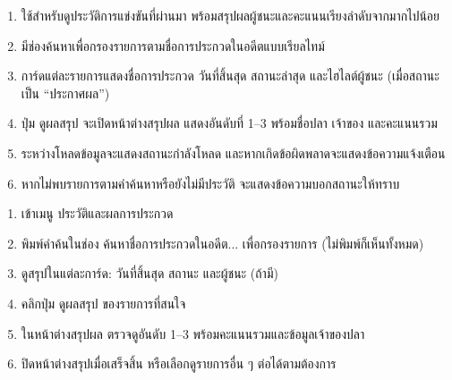 \par

\begin{sloppypar}
	\begin{enumerate}
		\item ใช้สำหรับดูประวัติการแข่งขันที่ผ่านมา พร้อมสรุปผลผู้ชนะและคะแนนเรียงลำดับจากมากไปน้อย
		\item มีช่องค้นหาเพื่อกรองรายการตามชื่อการประกวดในอดีตแบบเรียลไทม์
		\item การ์ดแต่ละรายการแสดงชื่อการประกวด วันที่สิ้นสุด สถานะล่าสุด และไฮไลต์ผู้ชนะ (เมื่อสถานะเป็น “ประกาศผล”)
		\item ปุ่ม ดูผลสรุป จะเปิดหน้าต่างสรุปผล แสดงอันดับที่ 1–3 พร้อมชื่อปลา เจ้าของ และคะแนนรวม
		\item ระหว่างโหลดข้อมูลจะแสดงสถานะกำลังโหลด และหากเกิดข้อผิดพลาดจะแสดงข้อความแจ้งเตือน
		\item หากไม่พบรายการตามคำค้นหาหรือยังไม่มีประวัติ จะแสดงข้อความบอกสถานะให้ทราบ
	\end{enumerate}
\end{sloppypar}

\par

\begin{sloppypar}
	\begin{enumerate}
		\item เข้าเมนู ประวัติและผลการประกวด
		\item พิมพ์คำค้นในช่อง ค้นหาชื่อการประกวดในอดีต... เพื่อกรองรายการ (ไม่พิมพ์ก็เห็นทั้งหมด)
		\item ดูสรุปในแต่ละการ์ด: วันที่สิ้นสุด สถานะ และผู้ชนะ (ถ้ามี)
		\item คลิกปุ่ม ดูผลสรุป ของรายการที่สนใจ
		\item ในหน้าต่างสรุปผล ตรวจดูอันดับ 1–3 พร้อมคะแนนรวมและข้อมูลเจ้าของปลา
		\item ปิดหน้าต่างสรุปเมื่อเสร็จสิ้น หรือเลือกดูรายการอื่น ๆ ต่อได้ตามต้องการ
	\end{enumerate}
\end{sloppypar}

\clearpage